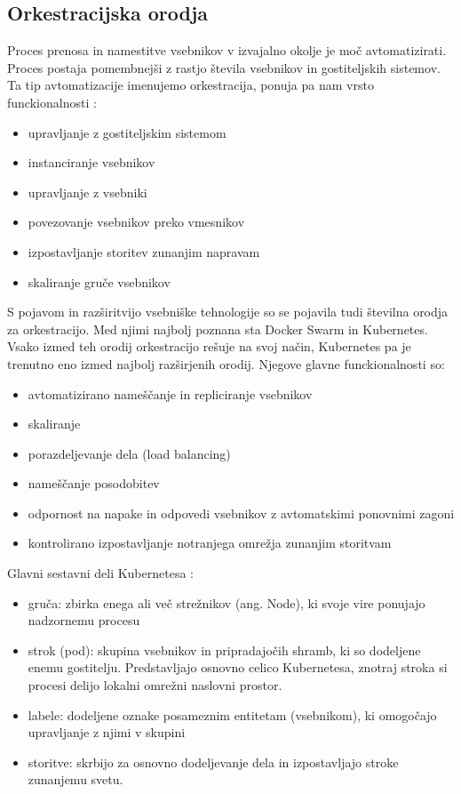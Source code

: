 \documentclass[a4paper, 12pt]{book}
\begin{document}
\subsection{Orkestracijska orodja}

Proces prenosa in namestitve vsebnikov v izvajalno okolje je moč avtomatizirati.
Proces postaja pomembnejši z rastjo števila vsebnikov in gostiteljskih sistemov. 
Ta tip avtomatizacije imenujemo orkestracija, ponuja pa nam vrsto funckionalnosti \cite{mongoKubernetes}:
\begin{itemize}
	\item upravljanje z gostiteljskim sistemom
	\item instanciranje vsebnikov
	\item upravljanje z vsebniki
	\item povezovanje vsebnikov preko vmesnikov
	\item izpostavljanje storitev zunanjim napravam
	\item skaliranje gruče vsebnikov
\end{itemize}

S pojavom in razširitvijo vsebniške tehnologije so se pojavila tudi številna orodja za orkestracijo.
Med njimi najbolj poznana sta Docker Swarm in Kubernetes.
Vsako izmed teh orodij orkestracijo rešuje na svoj način, Kubernetes pa je trenutno eno izmed najbolj razširjenih orodij.
Njegove glavne funckionalnosti so:
\begin{itemize}
	\item avtomatizirano nameščanje in repliciranje vsebnikov
	\item skaliranje
	\item porazdeljevanje dela (load balancing)
	\item nameščanje posodobitev
	\item odpornost na napake in odpovedi vsebnikov z avtomatskimi ponovnimi zagoni
	\item kontrolirano izpostavljanje notranjega omrežja zunanjim storitvam
\end{itemize}

Glavni sestavni deli Kubernetesa \cite{mongoKubernetes}: 
\begin{itemize}
	\item gruča: zbirka enega ali več strežnikov (ang. Node), ki svoje vire ponujajo nadzornemu procesu
	\item strok (pod): skupina vsebnikov in pripradajočih shramb, ki so dodeljene enemu gostitelju. Predstavljajo osnovno celico Kubernetesa, znotraj stroka si procesi delijo lokalni omrežni naslovni prostor.
	\item labele: dodeljene oznake posameznim entitetam (vsebnikom), ki omogočajo upravljanje z njimi v skupini
	\item storitve: skrbijo za osnovno dodeljevanje dela in izpostavljajo stroke zunanjemu svetu.
\end{itemize}
\end{document}
